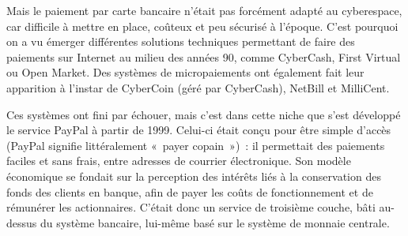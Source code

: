 Mais le paiement par carte bancaire n'était pas forcément adapté au cyberespace, car difficile à mettre en place, coûteux et peu sécurisé à l'époque. C'est pourquoi on a vu émerger différentes solutions techniques permettant de faire des paiements sur Internet au milieu des années 90, comme CyberCash, First Virtual ou Open Market. Des systèmes de micropaiements ont également fait leur apparition à l'instar de CyberCoin (géré par CyberCash), NetBill et MilliCent.


Ces systèmes ont fini par échouer, mais c'est dans cette niche que s'est développé le service PayPal à partir de 1999. Celui-ci était conçu pour être simple d'accès (PayPal signifie littéralement «~payer copain~»)~: il permettait des paiements faciles et sans frais, entre adresses de courrier électronique. Son modèle économique se fondait sur la perception des intérêts liés à la  conservation des fonds des clients en banque, afin de payer les coûts de fonctionnement et de rémunérer les actionnaires. C'était donc un service de troisième couche, bâti au-dessus du système bancaire, lui-même basé sur le système de monnaie centrale.

